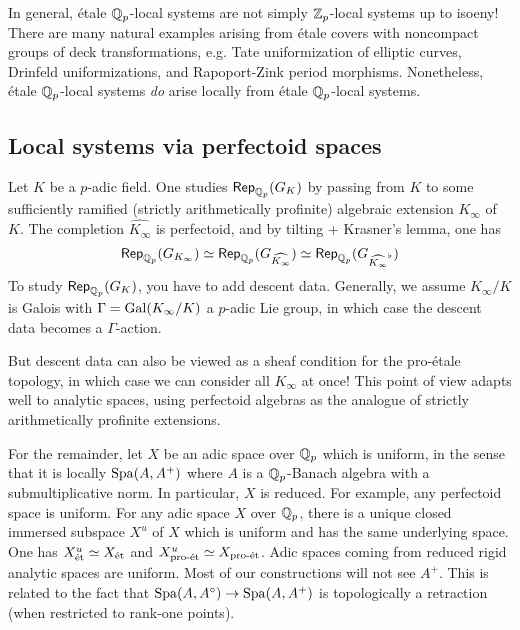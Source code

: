 In general, \'etale $\mathbb{Q}_p$-local systems are not simply $\mathbb{Z}_p$-local systems 
up to isoeny! There are many natural examples arising from \'etale covers with 
noncompact groups of deck transformations, e.g. Tate uniformization of elliptic 
curves, Drinfeld uniformizations, and Rapoport-Zink period morphisms. 
Nonetheless, \'etale $\mathbb{Q}_p$-local systems \emph{do} arise locally from 
\'etale $\mathbb{Q}_p$-local systems. 





\subsection{Local systems via perfectoid spaces}

Let $K$ be a $p$-adic field. One studies $\mathsf{Rep}_{\mathbb{Q}_p}(G_K)$ by passing from 
$K$ to some sufficiently ramified (strictly arithmetically profinite) algebraic 
extension $K_\infty$ of $K$. The completion $\widehat{K_\infty}$ is perfectoid, 
and by tilting + Krasner's lemma, one has 
\[
  \mathsf{Rep}_{\mathbb{Q}_p}(G_{K_\infty}) \simeq \mathsf{Rep}_{\mathbb{Q}_p}(G_{\widehat{K_\infty}}) \simeq \mathsf{Rep}_{\mathbb{Q}_p}(G_{\widehat{K_\infty}^\flat})
\]
To study $\mathsf{Rep}_{\mathbb{Q}_p}(G_K)$, you have to add descent data. Generally, we assume 
$K_\infty/K$ is Galois with $\Gamma=\operatorname{Gal}(K_\infty/K)$ a $p$-adic Lie group, in which 
case the descent data becomes a $\Gamma$-action. 

But descent data can also be viewed as a sheaf condition for the pro-\'etale 
topology, in which case we can consider all $K_\infty$ at once! This point of view 
adapts well to analytic spaces, using perfectoid algebras as the analogue of 
strictly arithmetically profinite extensions. 



For the remainder, let $X$ be an adic space over $\mathbb{Q}_p$ which is uniform, in the sense 
that it is locally $\operatorname{Spa}(A,A^+)$ where $A$ is a $\mathbb{Q}_p$-Banach algebra with a 
submultiplicative norm. In particular, $X$ is reduced. For example, any perfectoid 
space is uniform. For any adic space $X$ over $\mathbb{Q}_p$, there is a unique closed 
immersed subspace $X^u$ of $X$ which is uniform and has the same underlying 
space. One has $X_{\textnormal{\'et}}^u\simeq X_{\textnormal{\'et}}$ and $X_{\textnormal{pro-\'et}}^u \simeq X_{\textnormal{pro-\'et}}$. Adic 
spaces coming from reduced rigid analytic spaces are uniform. Most of our 
constructions will not see $A^+$. This is related to the fact that 
$\operatorname{Spa}(A,A^\circ) \to \operatorname{Spa}(A,A^+)$ is topologically a retraction (when restricted 
to rank-one points). 

